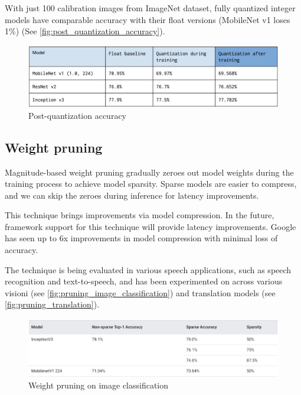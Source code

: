With just 100 calibration images from ImageNet dataset, fully quantized integer
models have comparable accuracy with their float versions (MobileNet v1 loses
1\%) (See \autoref{fig:post_quantization_accuracy}).

\begin{figure}[ht]
    \includegraphics[width=\textwidth]{images/introduction/post_quantization_accuracy.png}
    \centering
    \caption{Post-quantization accuracy}\label{fig:post_quantization_accuracy}
\end{figure}

\subsection{Weight pruning}
Magnitude-based weight pruning gradually zeroes out model weights during the
training process to achieve model sparsity. Sparse models are easier to
compress, and we can skip the zeroes during inference for latency improvements.

This technique brings improvements via model compression. In the future,
framework support for this technique will provide latency improvements.
Google has seen up to 6x improvements in model compression with minimal loss of
accuracy.

The technique is being evaluated in various speech applications, such as speech
recognition and text-to-speech, and has been experimented on across various
visioni (see \autoref{fig:pruning_image_classification}) and translation
models (see \autoref{fig:pruning_translation}).~\cite{tfmot:pruning}

\begin{figure}[ht]
    \includegraphics[width=\textwidth]{images/introduction/pruning_image_classification.png}
    \centering
    \caption{Weight pruning on image classification}\label{fig:pruning_image_classification}
\end{figure}

